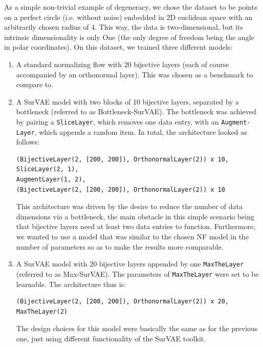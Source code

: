 As a simple non-trivial example of degeneracy, we chose the dataset to be points on a perfect circle (i.e. without noise) embedded in 2D euclidean space with an arbitrarily chosen radius of 4. This way, the data is two-dimensional, but its intrinsic dimensionality is only One (the only degree of freedom being the angle in polar coordinates). On this dataset, we trained three different models:

\begin{enumerate}
\item A standard normalizing flow with 20 bijective layers (each of course accompanied by an orthonormal layer). This was chosen as a benchmark to compare to.

\item A SurVAE model with two blocks of 10 bijective layers, separated by a bottleneck (referred to as Bottleneck-SurVAE). The bottleneck was achieved by pairing a \texttt{SliceLayer}, which removes one data entry, with an \texttt{Augment-\linebreak Layer}, which appends a random item. In total, the architecture looked as follows:

\begin{verbatim}
(BijectiveLayer(2, [200, 200]), OrthonormalLayer(2)) x 10,
SliceLayer(2, 1),
AugmentLayer(1, 2),
(BijectiveLayer(2, [200, 200]), OrthonormalLayer(2)) x 10
\end{verbatim}

This architecture was driven by the desire to reduce the number of data dimensions via a bottleneck, the main obstacle in this simple scenario being that bijective layers need at least two data entries to function. Furthermore, we wanted to use a model that was similar to the chosen NF model in the number of parameters so as to make the results more comparable.

\item A SurVAE model with 20 bijective layers appended by one \texttt{MaxTheLayer} (referred to as Max-SurVAE). The parameters of \texttt{MaxTheLayer} were set to be learnable. The architecture thus is:

\begin{verbatim}
(BijectiveLayer(2, [200, 200]), OrthonormalLayer(2)) x 20,
MaxTheLayer(2)
\end{verbatim}

The design choices for this model were basically the same as for the previous one, just using different functionality of the SurVAE toolkit.
\end{enumerate}

